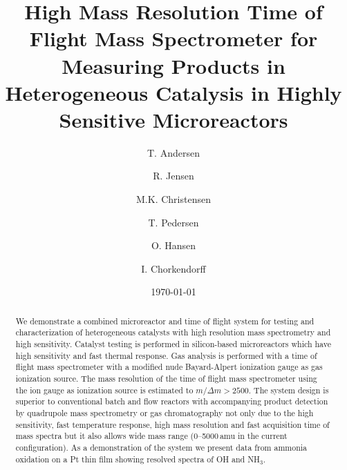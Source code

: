 \documentclass[aip,rsi]{revtex4-1}
\begin{document}

\title{High Mass Resolution Time of Flight Mass Spectrometer for Measuring Products in Heterogeneous Catalysis in Highly Sensitive Microreactors} %



\author{T. Andersen}
\author{R. Jensen}
\author{M.K. Christensen}
\author{T. Pedersen}
\author{O. Hansen}
\author{I. Chorkendorff}


\date{\today}

\begin{abstract}
We demonstrate a combined microreactor and time of flight system for testing and characterization of heterogeneous catalysts with high resolution mass spectrometry and high sensitivity. Catalyst testing is performed in silicon-based microreactors which have high sensitivity and fast thermal response. Gas analysis is performed with a time of flight mass spectrometer with a modified nude Bayard-Alpert ionization gauge as gas ionization source. The mass resolution of the time of flight mass spectrometer using the ion gauge as ionization source is estimated to $m/\Delta m>2500$. The system design is superior to conventional batch and flow reactors with accompanying product detection by quadrupole mass spectrometry or gas chromatography not only due to the high sensitivity, fast temperature response, high mass resolution and fast acquisition time of mass spectra but it also allows wide mass range (\mbox{0--5000}\,amu in the current configuration). As a demonstration of the system we present data from ammonia oxidation on a Pt thin film showing resolved spectra of OH and NH$_{3}$.
\end{abstract}
\end{document}
